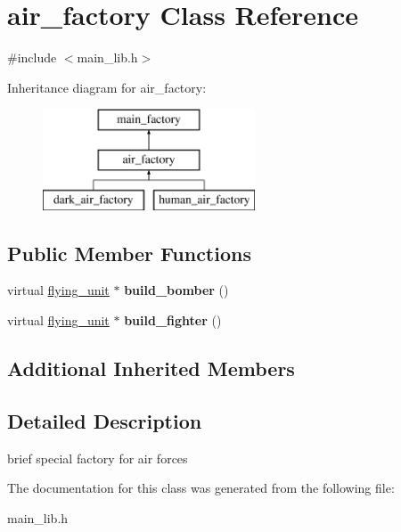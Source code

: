 \hypertarget{classair__factory}{}\section{air\+\_\+factory Class Reference}
\label{classair__factory}


{\ttfamily \#include $<$main\+\_\+lib.\+h$>$}

Inheritance diagram for air\+\_\+factory\+:\begin{figure}[H]
\begin{center}
\leavevmode
\includegraphics[height=3.000000cm]{classair__factory}
\end{center}
\end{figure}
\subsection*{Public Member Functions}
\begin{DoxyCompactItemize}
\item 
\mbox{\label{classair__factory_ac865a7285e585ed10c9f0f46e56276a1}} 
virtual \mbox{\hyperlink{classflying__unit}{flying\+\_\+unit}} $\ast$ {\bfseries build\+\_\+bomber} ()
\item 
\mbox{\label{classair__factory_a0fec153a637ae326eb914c974e974cf6}} 
virtual \mbox{\hyperlink{classflying__unit}{flying\+\_\+unit}} $\ast$ {\bfseries build\+\_\+fighter} ()
\end{DoxyCompactItemize}
\subsection*{Additional Inherited Members}


\subsection{Detailed Description}
brief special factory for air forces 

The documentation for this class was generated from the following file\+:\begin{DoxyCompactItemize}
\item 
main\+\_\+lib.\+h\end{DoxyCompactItemize}
